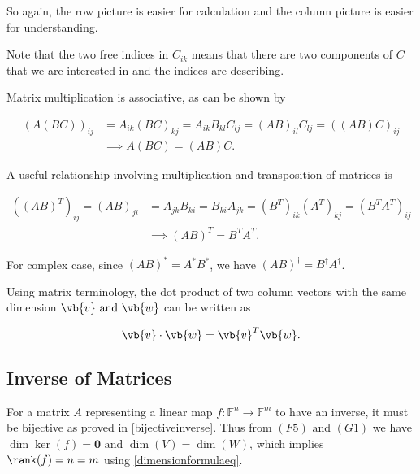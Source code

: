 \documentclass[a4paper,12pt]{report}
\begin{document}

So again, the row picture is easier for calculation and the column picture is easier for understanding.

Note that the two free indices in \(C_{ik} \) means that there are two components of \(C\) that we are interested in and the indices are describing. 

Matrix multiplication is associative, as can be shown by 

\begin{equation}
    \begin{aligned}
    (A(BC))_{ij} &= A_{ik}(BC)_{kj} = A_{ik}B_{kl}C_{lj} = (AB)_{il}C_{lj} = ((AB)C)_{ij} \\
    &\implies A(BC) = (AB)C.
    \end{aligned}
\end{equation}

A useful relationship involving multiplication and transposition of matrices is 

\begin{equation}
    \begin{aligned}
    ((AB)^{T} )_{ij} = (AB)_{ji} &= A _{jk}B_{ki} = B_{ki}A_{jk} = (B^{T} )_{ik} (A^{T} )_{kj} = (B^{T}A^{T}  )_{ij} \\
    &\implies (AB)^{T} = B^{T} A^{T}.   
    \end{aligned}     
\end{equation}

For complex case, since \((AB)^* = A^*B^*\), we have \((AB)^{\dagger} = B^{\dagger} A^{\dagger}\). 

Using matrix terminology, the dot product of two column vectors with the same dimension \(\vb{v} \text { and } \vb{w} \) can be written as 

\begin{equation}
    \vb{v} \cdot \vb{w} = \vb{v} ^{T} \vb{w}.
\end{equation}

\subsection{Inverse of Matrices}

For a matrix \(A\) representing a linear map \(f:\mathbb{F}^{n} \rightarrow \mathbb{F}^{m} \) to have an inverse, it must be bijective as proved in \cref{bijectiveinverse}. Thus from \((F5) \text { and } (G1)\) we have \(\dim \ker (f) = \boldsymbol{0} \text { and } \dim (V) = \dim (W)\), which implies \(\rank (f) = n = m\) using \cref{dimensionformulaeq}.
\end{document}
